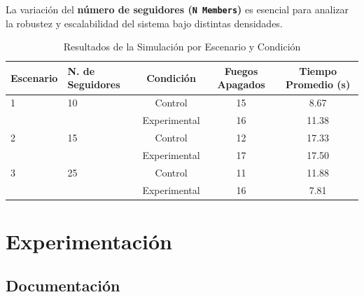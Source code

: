 \documentclass{article}
\begin{document}
La variación del \textbf{número de seguidores (\texttt{N Members})} es esencial para analizar la robustez y escalabilidad del sistema bajo distintas densidades.

\begin{table}[H]
\centering
\caption{Resultados de la Simulación por Escenario y Condición}
\label{tab:results}
\begin{tabular}{llccc}
\toprule
\textbf{Escenario} & \textbf{N. de Seguidores} & \textbf{Condición} & \textbf{Fuegos Apagados} & \textbf{Tiempo Promedio (s)} \\
\midrule
1 & 10 & Control      & 15 & 8.67  \\
  &    & Experimental & 16 & 11.38 \\
\midrule
2 & 15 & Control      & 12 & 17.33 \\
  &    & Experimental & 17 & 17.50 \\
\midrule
3 & 25 & Control      & 11 & 11.88 \\
  &    & Experimental & 16 & 7.81  \\
\bottomrule
\end{tabular}
\end{table}



\section{Experimentación}\label{sec:exp}

\subsection{Documentación}
\end{document}
